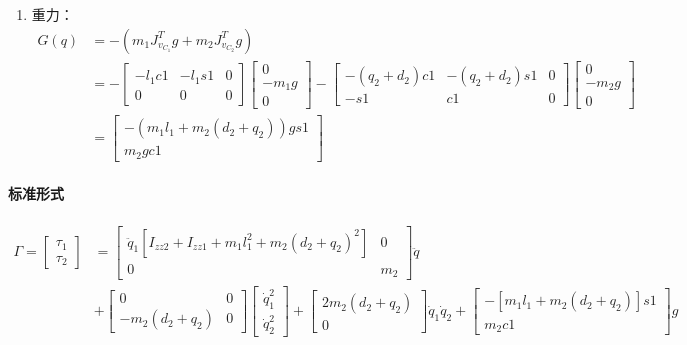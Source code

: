 \documentclass[
12pt, %
a4paper, 
oneside, %
]{scrartcl}
\begin{document}
{\begin{enumerate}
\begin{align*}
\end{align*}
\item 重力：
\begin{align*}
G(q) &= -(m_1 J_{v_{C_1}}^T g + m_2 J_{v_{C_2}}^T g) \\
&= -\begin{bmatrix} -l_1 c1 & -l_1 s1 & 0 \\ 0 & 0 & 0 \end{bmatrix} \begin{bmatrix} 0 \\ -m_1 g \\ 0 \end{bmatrix} - \begin{bmatrix} -(q_2 + d_2)c1 & -(q_2 + d_2)s1 & 0 \\ -s1 & c1 & 0 \end{bmatrix} \begin{bmatrix} 0 \\ -m_2 g \\ 0 \end{bmatrix} \\
&= \begin{bmatrix} -(m_1 l_1 + m_2(d_2 + q_2))gs1 \\ m_2 gc1 \end{bmatrix}
\end{align*}
\end{enumerate}
\paragraph{标准形式}
\begin{align*}
\Gamma = \begin{bmatrix} \tau_1 \\ \tau_2 \end{bmatrix} 
&= \begin{bmatrix} \ddot{q}_1[I_{zz2} + I_{zz1} + m_1 l_1^2 + m_2(d_2 + q_2)^2] & 0 \\ 0 & m_2 \end{bmatrix} \ddot{q} \\
&+ \begin{bmatrix} 0 & 0 \\ -m_2(d_2 + q_2) & 0 \end{bmatrix} \begin{bmatrix} \dot{q}_1^2\\ \dot{q}_2^2 \end{bmatrix} + \begin{bmatrix} 2m_2(d_2 + q_2) \\ 0 \end{bmatrix} \dot{q}_1 \dot{q}_2 + \begin{bmatrix} -[m_1 l_1 + m_2(d_2 + q_2)]s1 \\ m_2 c1 \end{bmatrix} g 
\end{align*}
}
\end{document}
